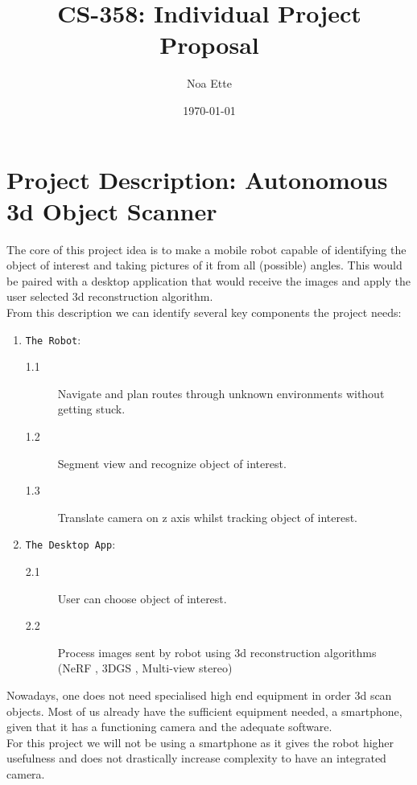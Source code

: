 \documentclass{article}
\title{CS-358: Individual Project Proposal}
\author{Noa Ette}
\date{\today}
\begin{document}
\maketitle
\vspace{45mm}
\tableofcontents
\newpage
\section{Project Description: Autonomous 3d Object Scanner}

The core of this project idea is to make a mobile robot capable of identifying the object of interest and taking pictures of it from all (possible) angles. This would be paired with a desktop application that would receive the images and apply the user selected 3d reconstruction algorithm.\\


From this description we can identify several key components the project needs: \begin{enumerate}
    \item \texttt{The Robot}:
    \begin{description}
            \item[1.1] Navigate and plan routes through unknown environments without getting stuck.
            \item[1.2] Segment view and recognize object of interest.
            \item[1.3] Translate camera on z axis whilst tracking object of interest.
    \end{description}
    \item \texttt{The Desktop App}:
    \begin{description}
        \item[2.1] User can choose object of interest.
        \item[2.2] Process images sent by robot using 3d reconstruction algorithms (NeRF \cite{mildenhall2020nerf}, 3DGS \cite{kerbl3Dgaussians}, Multi-view stereo)
    \end{description}
\end{enumerate}

Nowadays, one does not need specialised high end equipment in order 3d scan objects. Most of us already have the sufficient equipment needed, a smartphone, given that it has a functioning camera and the adequate software. \\
For this project we will not be using a smartphone as it gives the robot higher usefulness and does not drastically increase complexity to have an integrated camera. 
\end{document}
